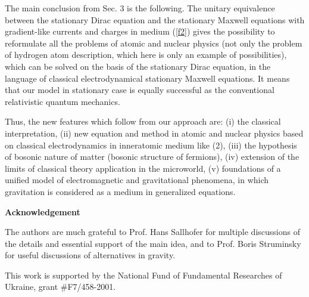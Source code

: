 \documentclass[a4paper,12pt]{article}
\begin{document}
The main conclusion from Sec. 3 is the following. The unitary equivalence
between the stationary Dirac equation and the stationary Maxwell equations
with gradient-like currents and charges in medium (\ref{f2}) gives the
possibility to reformulate all the problems of atomic and nuclear physics
(not only the problem of hydrogen atom description, which here is only an
example of possibilities), which can be solved on the basis of the
stationary Dirac equation, in the language of classical electrodynamical
stationary Maxwell equations. It means that our model in stationary case is
equally successful as the conventional relativistic quantum mechanics.

Thus, the new features which follow from our approach are: (i) the classical
interpretation, (ii) new equation and method in atomic and nuclear physics
based on classical electrodynamics in inneratomic medium like (2), (iii) the
hypothesis of bosonic nature of matter (bosonic structure of fermions), (iv)
extension of the limits of classical theory application in the microworld,
(v) foundations of a unified model of electromagnetic and gravitational
phenomena, in which gravitation is considered as a medium in generalized
equations.

\begin{center}
\textbf{Acknowledgement}
\end{center}

The authors are much grateful to Prof. Hans Sallhofer for multiple
discussions of the details and essential support of the main idea, and to
Prof. Boris Struminsky for useful discussions of alternatives in gravity.

This work is supported by the National Fund of Fundamental Researches of
Ukraine, grant \#F7/458-2001.
\end{document}
